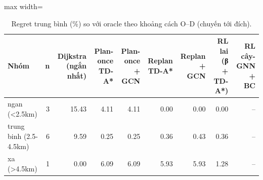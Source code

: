\begin{table}[!htbp]
\centering
\small
\caption{Regret trung bình (\%) so với oracle theo khoảng cách O–D (chuyến tới đích).}
\label{tab:tab_by_distance}
\begin{adjustbox}{max width=\linewidth}
\begin{tabular}{lrrrrrrrr}
\toprule
Nhóm & n & Dijkstra (ngắn nhất) & Plan-once TD-A* & Plan-once + GCN & Replan TD-A* & Replan + GCN & RL lai (β + TD-A*) & RL cây-GNN + BC \\
\midrule
ngan (<2.5km) & 3 & 15.43 & 4.11 & 4.11 & 0.00 & 0.00 & 0.00 & -- \\
trung binh (2.5-4.5km) & 6 & 9.59 & 0.25 & 0.25 & 0.36 & 0.43 & 0.36 & -- \\
xa (>4.5km) & 1 & 0.00 & 6.09 & 6.09 & 5.93 & 5.93 & 1.28 & -- \\
\bottomrule
\end{tabular}
\end{adjustbox}
\end{table}
